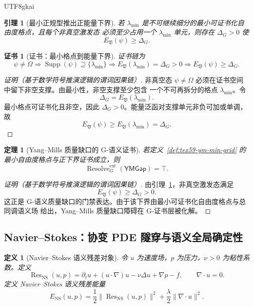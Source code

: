 \documentclass[12pt]{article}
\newtheorem{definition}{定义}[section]
\newtheorem{theorem}{定理}[section]
\newtheorem{lemma}{引理}[section]
\newtheorem{Certificate}{证书}[section]
\newcommand{\Vsys}{\mathfrak V}
\DeclareMathOperator{\Resolve}{Resolve}
\DeclareMathOperator{\Res}{Res}
\DeclareMathOperator{\Supp}{Supp}
\begin{document}
\begin{CJK*}{UTF8}{gkai}
\begin{lemma}[最小正规型推出正能量下界]
\label{lem:tex59-ym-min-gap}
若 \(\lambda_{\min}\) 是不可继续细分的最小可证书化自由度格点，且每个非真空激发态
必须至少占用一个 \(\lambda_{\min}\) 单元，则存在 \(\Delta_G>0\) 使
\[
  E_{\Vsys}(\psi)\ge\Delta_G.
\]
\end{lemma}

\begin{Certificate}[证书：最小格点到能量下界]
\label{cert:tex59-ym-min-gap}
证书链为
\[
  \psi\ne\Omega
  \Longrightarrow
  \Supp(\psi)\supseteq\{\lambda_{\min}\}
  \Longrightarrow
  E_{\Vsys}(\lambda_{\min})=\Delta_G>0
  \Longrightarrow
  E_{\Vsys}(\psi)\ge\Delta_G.
\]
\end{Certificate}

\begin{proof}[证明（基于数学符号推演逻辑的谓词因果链）]
非真空态 \(\psi\ne\Omega\) 必须在证书空间中留下非空支撑。由最小性，非空支撑至少包含
一个不可再拆分的格点 \(\lambda_{\min}\)。令
\[
  \Delta_G=E_{\Vsys}(\lambda_{\min}).
\]
最小格点可证书化且非空，因此 \(\Delta_G>0\)。能量泛函对支撑单元非负可加或单调，
故
\[
  E_{\Vsys}(\psi)\ge E_{\Vsys}(\lambda_{\min})=\Delta_G.
\]
\end{proof}

\begin{theorem}[Yang--Mills 质量缺口的 G-语义证书]
\label{thm:tex59-ym-resolution}
若定义~\ref{def:tex59-ym-min-grid} 的最小自由度格点与正下界证书成立，则
\[
  \Resolve_G^{\mathrm{ext}}(\mathsf{YMGap})=\top.
\]
\end{theorem}

\begin{proof}[证明（基于数学符号推演逻辑的谓词因果链）]
由引理~\ref{lem:tex59-ym-min-gap}，非真空激发态满足
\[
  E_{\Vsys}(\psi)\ge\Delta_G>0.
\]
这正是 G-语义质量缺口的门禁表达。由于该下界由最小可证书化自由度格点与总同调语义场
给出，Yang--Mills 质量缺口障碍在 G-证书层被化解。
\end{proof}

\subsection{Navier--Stokes：协变 PDE 隧穿与语义全局确定性}
\label{subsec:tex59-navier-stokes}

\begin{definition}[Navier--Stokes 语义残差对象]
\label{def:tex59-ns-object}
令 \(u\) 为速度场，\(p\) 为压力，\(\nu>0\) 为粘性系数。定义
\[
  \Res_{\mathrm{NS}}(u,p)
  =
  \partial_tu+(u\cdot\nabla)u-\nu\Delta u+\nabla p-f,
  \qquad
  \nabla\cdot u=0.
\]
定义 Navier--Stokes 语义残差能量
\[
  E_{\mathrm{NS}}(u,p)
  =
  \frac12\|\Res_{\mathrm{NS}}(u,p)\|^2
  +
  \frac{\lambda}{2}\|\nabla\cdot u\|^2.
\]
\end{definition}


\end{CJK*}
\end{document}
